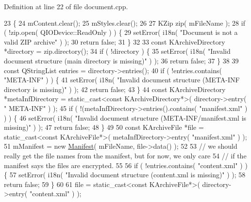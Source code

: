 Definition at line 22 of file document.\+cpp.


\begin{DoxyCode}
23 \{
24   mContent.clear();
25   mStyles.clear();
26 
27   KZip zip( mFileName );
28   \textcolor{keywordflow}{if} ( !zip.open( QIODevice::ReadOnly ) ) \{
29     setError( i18n( \textcolor{stringliteral}{"Document is not a valid ZIP archive"} ) );
30     \textcolor{keywordflow}{return} \textcolor{keyword}{false};
31   \}
32 
33   \textcolor{keyword}{const} KArchiveDirectory *directory = zip.directory();
34   \textcolor{keywordflow}{if} ( !directory ) \{
35     setError( i18n( \textcolor{stringliteral}{"Invalid document structure (main directory is missing)"} ) );
36     \textcolor{keywordflow}{return} \textcolor{keyword}{false};
37   \}
38 
39   \textcolor{keyword}{const} QStringList entries = directory->entries();
40   \textcolor{keywordflow}{if} ( !entries.contains( \textcolor{stringliteral}{"META-INF"} ) ) \{
41     setError( i18n( \textcolor{stringliteral}{"Invalid document structure (META-INF directory is missing)"} ) );
42     \textcolor{keywordflow}{return} \textcolor{keyword}{false};
43   \}
44   \textcolor{keyword}{const} KArchiveDirectory *metaInfDirectory = \textcolor{keyword}{static\_cast<}\textcolor{keyword}{const }KArchiveDirectory*\textcolor{keyword}{>}( directory->entry( \textcolor{stringliteral}{"
      META-INF"} ) );
45   \textcolor{keywordflow}{if} ( !(metaInfDirectory->entries().contains( \textcolor{stringliteral}{"manifest.xml"} ) ) ) \{
46     setError( i18n( \textcolor{stringliteral}{"Invalid document structure (META-INF/manifest.xml is missing)"} ) );
47     \textcolor{keywordflow}{return} \textcolor{keyword}{false};
48   \}
49 
50   \textcolor{keyword}{const} KArchiveFile *file = \textcolor{keyword}{static\_cast<}\textcolor{keyword}{const }KArchiveFile*\textcolor{keyword}{>}( metaInfDirectory->entry( \textcolor{stringliteral}{"manifest.xml"} ) );
51   mManifest = \textcolor{keyword}{new} \hyperlink{classOOO_1_1Manifest}{Manifest}( mFileName, file->data() );
52 
53   \textcolor{comment}{// we should really get the file names from the manifest, but for now, we only care}
54   \textcolor{comment}{// if the manifest says the files are encrypted.}
55 
56   \textcolor{keywordflow}{if} ( !entries.contains( \textcolor{stringliteral}{"content.xml"} ) ) \{
57     setError( i18n( \textcolor{stringliteral}{"Invalid document structure (content.xml is missing)"} ) );
58     \textcolor{keywordflow}{return} \textcolor{keyword}{false};
59   \}
60 
61   file = \textcolor{keyword}{static\_cast<}\textcolor{keyword}{const }KArchiveFile*\textcolor{keyword}{>}( directory->entry( \textcolor{stringliteral}{"content.xml"} ) );

\end{DoxyCode}
